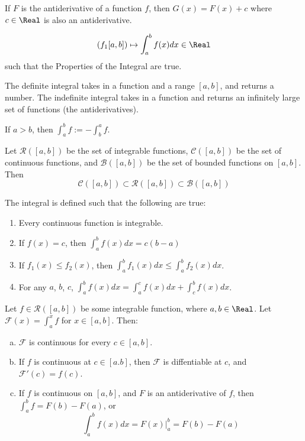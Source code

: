 \begin{theorem}
  If $F$ is the antiderivative of a function $f$, then $G(x) = F(x) + c$ where $c \in \Real$ is also an antiderivative.
\end{theorem}

\begin{definition}[Integral]
  \[
    (f_1 [a, b]) \mapsto \int_a^b f(x)dx \in \Real
  \]
  such that the Properties of the Integral are true.
\end{definition}

The definite integral takes in a function and a range $[a, b]$, and returns a number. The indefinite integral takes in a function and returns an infinitely large set of functions (the antiderivatives).

If $a > b$, then $\int_a^b f := -\int_b^a f$.

Let $\mathcal{R}([a,b])$ be the set of integrable functions, $\mathcal{C}([a,b])$ be the set of continuous functions, and $\mathcal{B}([a,b])$ be the set of bounded functions on $[a, b]$. Then
\[
  \mathcal{C}([a,b]) \subset \mathcal{R}([a,b]) \subset \mathcal{B}([a,b])
\]

\begin{theorem}
  The integral is defined such that the following are true:
  \begin{enumerate}[start=0,label={(I\arabic*)}]
    \item Every continuous function is integrable.
    \item If $f(x) = c$, then $\int_a^b f(x) dx = c(b - a)$
    \item If $f_1(x) \leq f_2(x)$, then $\int_a^b f_1(x)dx \leq \int_a^b f_2(x)dx$.
    \item For any $a$, $b$, $c$, $\displaystyle \int_a^b f(x)dx = \int_a^c f(x)dx + \int_c^b f(x)dx$.
  \end{enumerate}
\end{theorem}

\begin{theorem}
  Let $f \in \mathcal{R}([a, b])$ be some integrable function, where $a, b \in \Real$. Let $\mathcal{F}(x) = \int_a^x f$ for $x \in [a, b]$. Then:
  \begin{enumerate}[(a)]
    \item $\mathcal{F}$ is continuous for every $c \in [a, b]$.
    \item If $f$ is continuous at $c \in [a. b]$, then $\mathcal{F}$ is diffentiable at $c$, and $\mathcal{F}'(c) = f(c)$.
    \item If $f$ is continuous on $[a, b]$, and $F$ is an antiderivative of $f$, then $\int_a^b f = F(b) - F(a)$, or
      \[
        \int_a^b f(x) dx = F(x) \bigg\rvert_a^b = F(b) - F(a)
      \]
  \end{enumerate}
\end{theorem}


